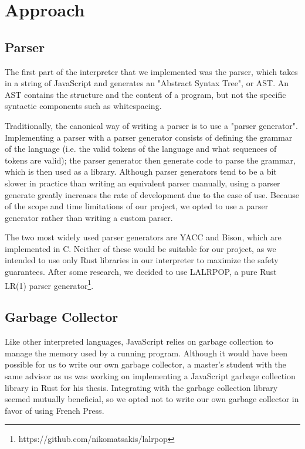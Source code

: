 \documentclass{article}
\begin{document}
\section*{Approach}

\subsection*{Parser}

The first part of the interpreter that we implemented was the parser, which
takes in a string of JavaScript and generates an "Abstract Syntax Tree", or AST.
An AST contains the structure and the content of a program, but not the specific
syntactic components such as whitespacing. \newline

Traditionally, the canonical way of writing a parser is to use a "parser
generator". Implementing a parser with a parser generator consists of defining
the grammar of the language (i.e. the valid tokens of the language and what
sequences of tokens are valid); the parser generator then generate code to parse
the grammar, which is then used as a library. Although parser generators tend to
be a bit slower in practice than writing an equivalent parser manually, using
a parser generate greatly increases the rate of development due to the ease of
use. Because of the scope and time limitations of our project, we opted to use a
parser generator rather than writing a custom parser.

The two most widely used parser generators are YACC and Bison, which are
implemented in C. Neither of these would be suitable for our project, as we
intended to use only Rust libraries in our interpreter to maximize the safety
guarantees. After some research, we decided to use LALRPOP, a pure Rust LR(1)
parser generator\footnote{https://github.com/nikomatsakis/lalrpop}.

\subsection*{Garbage Collector}

Like other interpreted languages, JavaScript relies on garbage collection to
manage the memory used by a running program. Although it would have been
possible for us to write our own garbage collector, a master's student
with the same advisor as us was working on implementing a JavaScript garbage
collection library in Rust for his thesis. Integrating with the garbage
collection library seemed mutually beneficial, so we opted not to write our own
garbage collector in favor of using French Press.
\end{document}

